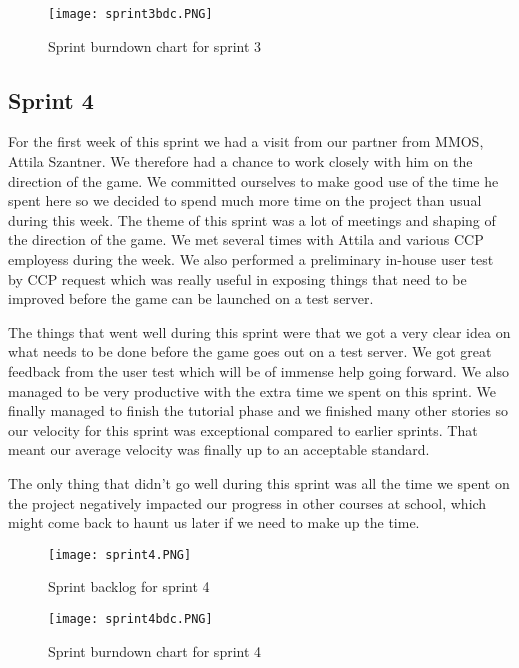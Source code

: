 \begin{figure}[H]
	\centering
	\graphicspath{ {./graphics/} }
    \centerline{\texttt{[image: sprint3bdc.PNG]}}
    \caption{\label{fig:s3bd}Sprint burndown chart for sprint 3}
\end{figure}

\subsection{Sprint 4}
For the first week of this sprint we had a visit from our partner from MMOS, Attila Szantner. We therefore had a chance to work closely with him on the direction of the game. We committed ourselves to make good use of the time he spent here so we decided to spend much more time on the project than usual during this week. The theme of this sprint was a lot of meetings and shaping of the direction of the game. We met several times with Attila and various CCP employess during the week. We also performed a preliminary in-house user test by CCP request which was really useful in exposing things that need to be improved before the game can be launched on a test server.

The things that went well during this sprint were that we got a very clear idea on what needs to be done before the game goes out on a test server. We got great feedback from the user test which will be of immense help going forward. We also managed to be very productive with the extra time we spent on this sprint. We finally managed to finish the tutorial phase and we finished many other stories so our velocity for this sprint was exceptional compared to earlier sprints. That meant our average velocity was finally up to an acceptable standard.

The only thing that didn't go well during this sprint was all the time we spent on the project negatively impacted our progress in other courses at school, which might come back to haunt us later if we need to make up the time.

\begin{landscape}

\begin{figure}[H]
	\centering
	\graphicspath{ {./graphics/} }
    \centerline{\texttt{[image: sprint4.PNG]}}
    \caption{\label{fig:s4}Sprint backlog for sprint 4}
\end{figure}

\end{landscape}

\begin{figure}[H]
	\centering
	\graphicspath{ {./graphics/} }
    \centerline{\texttt{[image: sprint4bdc.PNG]}}
    \caption{\label{fig:s4bd}Sprint burndown chart for sprint 4}
\end{figure}

